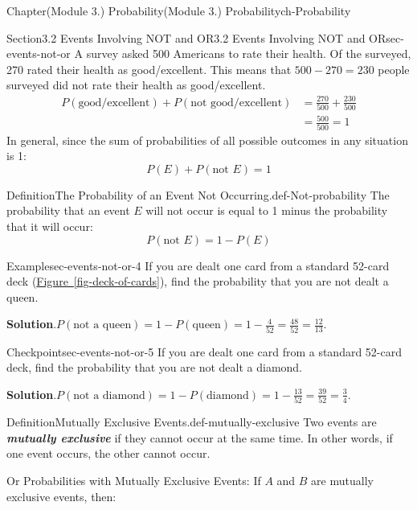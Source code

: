 \documentclass[oneside,10pt,]{book}
\newcommand{\blocktitlefont}{\relax}
\newcommand{\xreffont}{\relax}
\newcommand{\alert}[1]{\textbf{\textit{#1}}}
\newcommand{\amp}{&}
\begin{document}
\begin{chapterptx}{Chapter}{(Module 3.) Probability}{}{(Module 3.) Probability}{}{}{ch-Probability}
\begin{sectionptx}{Section}{3.2 Events Involving NOT and OR}{}{3.2 Events Involving NOT and OR}{}{}{sec-events-not-or}
A survey asked 500 Americans to rate their health. Of the surveyed, 270 rated their health as good\slash{}excellent. This means that \(500 - 270 = 230\) people surveyed did not rate their health as good\slash{}excellent.%
\begin{align*}
P(\text{good/excellent}) + P(\text{not good/excellent}) \amp = \frac{270}{500} + \frac{230}{500}\\
\amp = \frac{500}{500} = 1
\end{align*}
In general, since the sum of probabilities of all possible outcomes in any situation is 1:%
\begin{equation*}
P(E) + P(\text{not } E) = 1
\end{equation*}
%
\begin{definition}{Definition}{The Probability of an Event Not Occurring.}{def-Not-probability}%
The probability that an event \(E\) will not occur is equal to 1 minus the probability that it will occur:%
\begin{equation*}
P(\text{not } E) = 1 - P(E)
\end{equation*}
%
\end{definition}
\begin{example}{Example}{}{sec-events-not-or-4}%
If you are dealt one card from a standard 52-card deck (\hyperref[fig-deck-of-cards]{Figure~{\xreffont\ref{fig-deck-of-cards}}}), find the probability that you are not dealt a queen.%
\par\smallskip%
\noindent\textbf{\blocktitlefont Solution}.\hypertarget{sec-events-not-or-4-2}{}\quad{}\(P(\text{not a queen}) = 1 - P(\text{queen}) = 1 - \frac{4}{52} = \frac{48}{52} = \frac{12}{13}\).%
\end{example}
\begin{inlineexercise}{Checkpoint}{}{sec-events-not-or-5}%
If you are dealt one card from a standard 52-card deck, find the probability that you are not dealt a diamond.%
\par\smallskip%
\noindent\textbf{\blocktitlefont Solution}.\hypertarget{sec-events-not-or-5-2}{}\quad{}\(P(\text{not a diamond}) = 1 - P(\text{diamond}) = 1 - \frac{13}{52} = \frac{39}{52} = \frac{3}{4}\).%
\end{inlineexercise}%
\begin{definition}{Definition}{Mutually Exclusive Events.}{def-mutually-exclusive}%
Two events are \alert{mutually exclusive} if they cannot occur at the same time. In other words, if one event occurs, the other cannot occur.%
\par
Or Probabilities with Mutually Exclusive Events: If \(A\) and \(B\) are mutually exclusive events, then:%

\end{definition}
\end{sectionptx}
\end{chapterptx}
\end{document}
